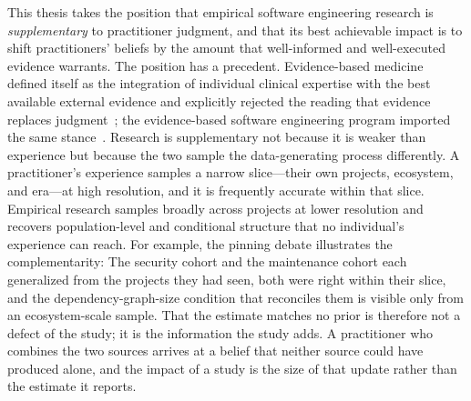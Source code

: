 This thesis takes the position that empirical software engineering research is \emph{supplementary} to practitioner judgment, and that its best achievable impact is to shift practitioners' beliefs by the amount that well-informed and well-executed evidence warrants.
The position has a precedent.
Evidence-based medicine defined itself as the integration of individual clinical expertise with the best available external evidence and explicitly rejected the reading that evidence replaces judgment~\cite{sackett1996evidence}; the evidence-based software engineering program imported the same stance~\cite{DBLP:conf/icse/KitchenhamDJ04, DBLP:journals/software/DybaKJ05}.
Research is supplementary not because it is weaker than experience but because the two sample the data-generating process differently.
A practitioner's experience samples a narrow slice---their own projects, ecosystem, and era---at high resolution, and it is frequently accurate within that slice.
Empirical research samples broadly across projects at lower resolution and recovers population-level and conditional structure that no individual's experience can reach.
For example, the pinning debate illustrates the complementarity: The security cohort and the maintenance cohort each generalized from the projects they had seen, both were right within their slice, and the dependency-graph-size condition that reconciles them is visible only from an ecosystem-scale sample.
That the estimate matches no prior is therefore not a defect of the study; it is the information the study adds.
A practitioner who combines the two sources arrives at a belief that neither source could have produced alone, and the impact of a study is the size of that update rather than the estimate it reports.

